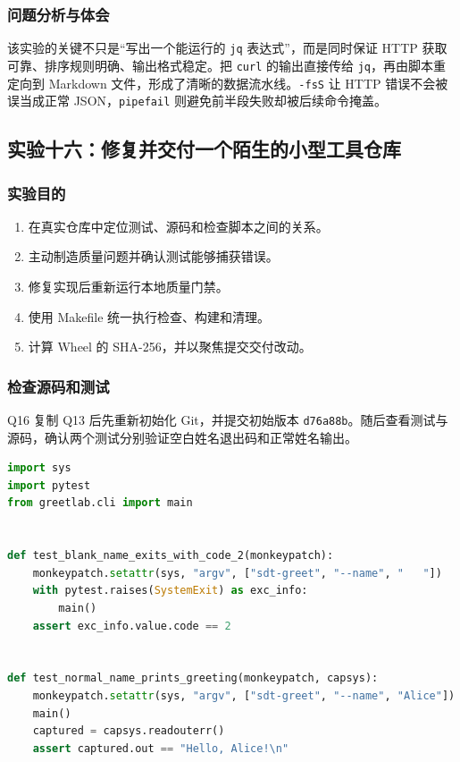 \documentclass[UTF8,12pt,a4paper]{ctexart}
\begin{document}
\subsubsection{问题分析与体会}

该实验的关键不只是“写出一个能运行的 \texttt{jq} 表达式”，而是同时保证 HTTP 获取可靠、排序规则明确、输出格式稳定。把 \texttt{curl} 的输出直接传给 \texttt{jq}，再由脚本重定向到 Markdown 文件，形成了清晰的数据流水线。\texttt{-fsS} 让 HTTP 错误不会被误当成正常 JSON，\texttt{pipefail} 则避免前半段失败却被后续命令掩盖。

\subsection{实验十六：修复并交付一个陌生的小型工具仓库}

\subsubsection{实验目的}

\begin{enumerate}[label=\arabic*.]
    \item 在真实仓库中定位测试、源码和检查脚本之间的关系。
    \item 主动制造质量问题并确认测试能够捕获错误。
    \item 修复实现后重新运行本地质量门禁。
    \item 使用 Makefile 统一执行检查、构建和清理。
    \item 计算 Wheel 的 SHA-256，并以聚焦提交交付改动。
\end{enumerate}

\subsubsection{检查源码和测试}

Q16 复制 Q13 后先重新初始化 Git，并提交初始版本 \texttt{d76a88b}。随后查看测试与源码，确认两个测试分别验证空白姓名退出码和正常姓名输出。

\begin{lstlisting}[language=Python]
import sys
import pytest
from greetlab.cli import main


def test_blank_name_exits_with_code_2(monkeypatch):
    monkeypatch.setattr(sys, "argv", ["sdt-greet", "--name", "   "])
    with pytest.raises(SystemExit) as exc_info:
        main()
    assert exc_info.value.code == 2


def test_normal_name_prints_greeting(monkeypatch, capsys):
    monkeypatch.setattr(sys, "argv", ["sdt-greet", "--name", "Alice"])
    main()
    captured = capsys.readouterr()
    assert captured.out == "Hello, Alice!\n"
\end{lstlisting}
\end{document}
